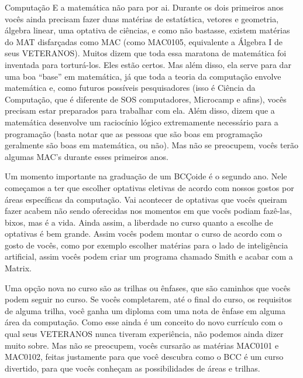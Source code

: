 \begin{subsecao}{Computação}
E a matemática não para por ai. Durante os dois primeiros anos vocês ainda
precisam fazer duas matérias de estatística, vetores e geometria, álgebra linear, uma
optativa de ciências, e como não bastasse, existem matérias do MAT disfarçadas
como MAC (como MAC0105, equivalente a Álgebra I de seus VETERANOS). Muitos dizem
que toda essa maratona de matemática foi inventada para torturá-los. Eles estão
certos. Mas além disso, ela serve para dar uma boa ``base'' em matemática, já
que toda a teoria da computação envolve matemática e, como futuros possíveis
pesquisadores (isso é Ciência da Computação, que é diferente de SOS
computadores, Microcamp e afins), vocês precisam estar preparados para trabalhar
com ela. Além disso, dizem que a matemática desenvolve um raciocínio lógico
extremamente necessário para a programação (basta notar que as pessoas que são
boas em programação geralmente são boas em matemática, ou não). Mas não se
preocupem, vocês terão algumas MAC's durante esses primeiros anos.

Um momento importante na graduação de um BCÇoide é o segundo ano. Nele começamos
a ter que escolher optativas eletivas de acordo com nossos gostos por áreas
específicas da computação. Vai acontecer de optativas que vocês queiram fazer
acabem não sendo oferecidas nos momentos em que vocês podiam fazê-las, bixos,
mas é a vida. Ainda assim, a liberdade no curso quanto a escolhe de optativas é
bem grande. Assim vocês podem montar o curso de acordo com o gosto de vocês,
como por exemplo escolher matérias para o lado de inteligência artificial, assim
vocês podem criar um programa chamado Smith e acabar com a Matrix.

Uma opção nova no curso são as trilhas ou ênfases, que são caminhos que vocês
podem seguir no curso. Se vocês completarem, até o final do curso, os requisitos
de alguma trilha, você ganha um diploma com uma nota de ênfase em alguma área da
computação. Como esse ainda é um conceito do novo currículo com o qual seus
VETERANOS nunca tiveram experiência, não podemos ainda dizer muito sobre. Mas
não se preocupem, vocês cursarão as matérias MAC0101 e MAC0102, feitas
justamente para que você descubra como o BCC é um curso divertido, para que
vocês conheçam as possibilidades de áreas e trilhas.


\end{subsecao}
